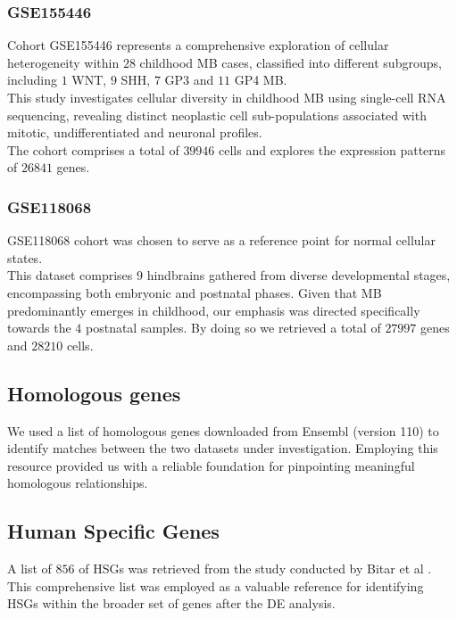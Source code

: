 \documentclass[10pt]{SelfArx} %
\begin{document}
\subsubsection{GSE155446}
Cohort GSE155446 \cite{riemondy2022neoplastic} represents a comprehensive exploration of cellular heterogeneity within $28$ childhood MB cases, classified into different subgroups, including $1$ WNT, $9$ SHH, $7$ GP3 and $11$ GP4 MB. \\
This study investigates cellular diversity in childhood MB using single-cell RNA sequencing, revealing distinct neoplastic cell sub-populations associated with mitotic, undifferentiated and neuronal profiles. \\
The cohort comprises a total of $39946$ cells and explores the expression patterns of $26841$ genes.

\subsubsection{GSE118068}\label{sec:GSE118068}
GSE118068 \cite{vladoiu2019childhood} cohort was chosen to serve as a reference point for normal cellular states. \\
This dataset comprises $9$ hindbrains gathered from diverse developmental stages, encompassing both embryonic and postnatal phases. Given that MB predominantly emerges in childhood, our emphasis was directed specifically towards the $4$ postnatal samples. By doing so we retrieved a total of $27997$ genes and $28210$ cells. 

\subsection{Homologous genes}\label{sec:homologous_genes}
We used a list of homologous genes downloaded from Ensembl (version 110) \cite{biomart_ensembl110} to identify matches between the two datasets under investigation. Employing this resource provided us with a reliable foundation for pinpointing meaningful homologous relationships.  

\subsection{Human Specific Genes}\label{sec:human_specific_genes}
A list of $856$ of HSGs was retrieved from the study conducted by Bitar et al \cite{bitar2019genes}. This comprehensive list was employed as a valuable reference for identifying HSGs within the broader set of genes after the DE analysis.
\end{document}
